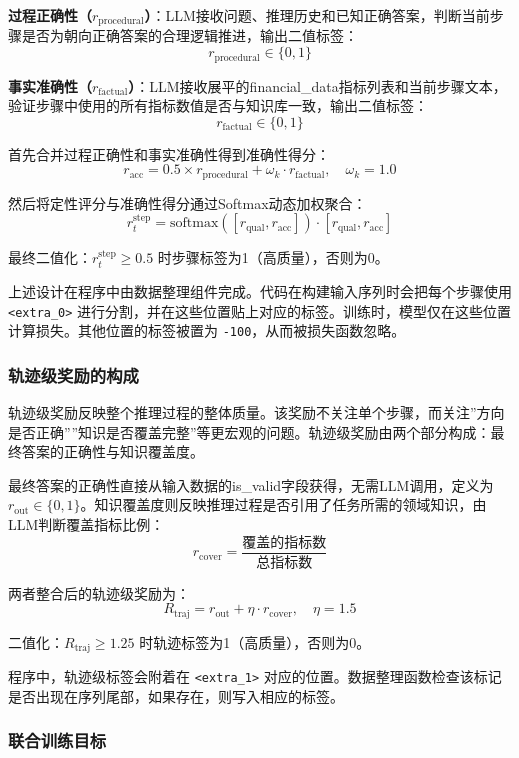 \documentclass[professional,privacy,print,win,long,STEM,AutoFakeBold]{def/buaa}
\begin{document}
\textbf{过程正确性（\(r_{\mathrm{procedural}}\)）}：LLM接收问题、推理历史和已知正确答案，判断当前步骤是否为朝向正确答案的合理逻辑推进，输出二值标签：
\[
r_{\mathrm{procedural}} \in \{0, 1\}
\]

\textbf{事实准确性（\(r_{\mathrm{factual}}\)）}：LLM接收展平的financial\_data指标列表和当前步骤文本，验证步骤中使用的所有指标数值是否与知识库一致，输出二值标签：
\[
r_{\mathrm{factual}} \in \{0, 1\}
\]

首先合并过程正确性和事实准确性得到准确性得分：
\[
r_{\mathrm{acc}} = 0.5 \times r_{\mathrm{procedural}} + \omega_k \cdot r_{\mathrm{factual}}, \quad \omega_k = 1.0
\]

然后将定性评分与准确性得分通过Softmax动态加权聚合：
\[
r_t^{\mathrm{step}} = \mathrm{softmax}([r_{\mathrm{qual}}, r_{\mathrm{acc}}]) \cdot [r_{\mathrm{qual}}, r_{\mathrm{acc}}]
\]

最终二值化：\(r_t^{\mathrm{step}} \geq 0.5\) 时步骤标签为1（高质量），否则为0。

上述设计在程序中由数据整理组件完成。代码在构建输入序列时会把每个步骤使用 \verb|<extra_0>| 进行分割，并在这些位置贴上对应的标签。训练时，模型仅在这些位置计算损失。其他位置的标签被置为 \verb|-100|，从而被损失函数忽略。

\subsubsection{轨迹级奖励的构成}

轨迹级奖励反映整个推理过程的整体质量。该奖励不关注单个步骤，而关注”方向是否正确””知识是否覆盖完整”等更宏观的问题。轨迹级奖励由两个部分构成：最终答案的正确性与知识覆盖度。

最终答案的正确性直接从输入数据的is\_valid字段获得，无需LLM调用，定义为 \(r_{\mathrm{out}} \in \{0,1\}\)。知识覆盖度则反映推理过程是否引用了任务所需的领域知识，由LLM判断覆盖指标比例：
\[
r_{\mathrm{cover}} = \frac{\text{覆盖的指标数}}{\text{总指标数}}
\]

两者整合后的轨迹级奖励为：
\[
R_{\mathrm{traj}} = r_{\mathrm{out}} + \eta \cdot r_{\mathrm{cover}}, \quad \eta = 1.5
\]

二值化：\(R_{\mathrm{traj}} \geq 1.25\) 时轨迹标签为1（高质量），否则为0。

程序中，轨迹级标签会附着在 \verb|<extra_1>| 对应的位置。数据整理函数检查该标记是否出现在序列尾部，如果存在，则写入相应的标签。

\subsubsection{联合训练目标}
\end{document}
